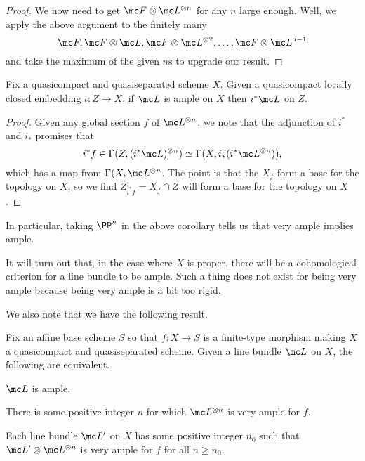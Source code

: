 \documentclass[../notes.tex]{subfiles}
\begin{document}
\begin{proof}
	We now need to get $\mc F\otimes\mc L^{\otimes n}$ for any $n$ large enough. Well, we apply the above argument to the finitely many
	\[\mc F,\mc F\otimes\mc L,\mc F\otimes\mc L^{\otimes2},\ldots,\mc F\otimes\mc L^{d-1}\]
	and take the maximum of the given $n$s to upgrade our result.
\end{proof}
\begin{corollary}
	Fix a quasicompact and quasiseparated scheme $X$. Given a quasicompact locally closed embedding $\iota\colon Z\to X$, if $\mc L$ is ample on $X$ then $i^*\mc L$ on $Z$.
\end{corollary}
\begin{proof}
	Given any global section $f$ of $\mc L^{\otimes n}$, we note that the adjunction of $i^*$ and $i_*$ promises that
	\[i^*f\in\Gamma(Z,(i^*\mc L)^{\otimes n})\simeq\Gamma(X,i_*(i^*\mc L^{\otimes n})),\]
	which has a map from $\Gamma(X,\mc L^{\otimes n}$. The point is that the $X_f$ form a base for the topology on $X$, so we find $Z_{i^*f}=X_f\cap Z$ will form a base for the topology on $X$.
\end{proof}
\begin{remark}
	In particular, taking $\PP^n$ in the above corollary tells us that very ample implies ample.
\end{remark}
\begin{remark}
	It will turn out that, in the case where $X$ is proper, there will be a cohomological criterion for a line bundle to be ample. Such a thing does not exist for being very ample because being very ample is a bit too rigid.
\end{remark}
We also note that we have the following result.
\begin{proposition} \label{prop:fix-powers-ample}
	Fix an affine base scheme $S$ so that $f\colon X\to S$ is a finite-type morphism making $X$ a quasicompact and quasiseparated scheme. Given a line bundle $\mc L$ on $X$, the following are equivalent.
	\begin{listalph}
		\item $\mc L$ is ample.
		\item There is some positive integer $n$ for which $\mc L^{\otimes n}$ is very ample for $f$.
		\item Each line bundle $\mc L'$ on $X$ has some positive integer $n_0$ such that $\mc L'\otimes\mc L^{\otimes n}$ is very ample for $f$ for all $n\ge n_0$.
	\end{listalph}
\end{proposition}
\end{document}
